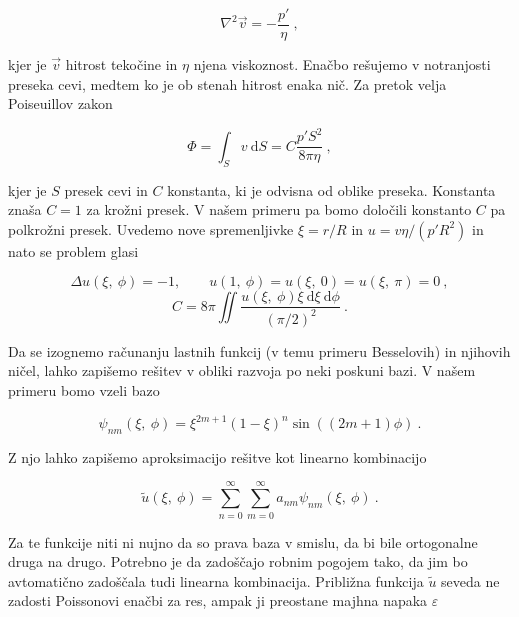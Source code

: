 \documentclass[a4paper]{article}
\newcommand{\ddd}{\mathrm{d}}
\begin{document}
\begin{equation}
    \nabla^2 \vec{v} = -\frac{p'}{\eta}\>,
    \label{eq:poisson}
\end{equation}

kjer je $\vec{v}$ hitrost tekočine in $\eta$ njena viskoznost. Enačbo rešujemo v notranjosti preseka cevi, medtem ko
je ob stenah hitrost enaka nič. Za pretok velja Poiseuillov zakon

\begin{equation}
    \Phi = \int_S{v\>\ddd S}  = C \frac{p' S^2}{8\pi\eta}\>,
    \label{eq:poiseuille}
\end{equation}

kjer je $S$ presek cevi in $C$ konstanta, ki je odvisna od oblike preseka. Konstanta znaša $C = 1$ za krožni presek.
V našem primeru pa bomo določili konstanto $C$ pa polkrožni presek. Uvedemo nove spremenljivke $\xi = r/R$ in 
$u=v\eta/(p'R^2)$ in nato se problem glasi

\begin{equation}
    \Delta u(\xi,\>\phi) = -1, \qquad u(1,\>\phi) = u(\xi,\>0) = u(\xi,\>\pi) = 0\>,
    \label{eq:poisson2}
\end{equation}
\begin{equation}
    C = 8\pi \iint{\frac{u(\xi,\>\phi)\xi\>\ddd\xi\> \ddd\phi}{(\pi/2)^2}}\>.
\end{equation}

Da se izognemo računanju lastnih funkcij (v temu primeru Besselovih) in njihovih ničel, lahko zapišemo
rešitev v obliki razvoja po neki poskuni bazi. V našem primeru bomo vzeli bazo

\begin{equation}
    \psi_{nm}(\xi,\>\phi) = \xi^{2m+1}(1-\xi)^n \sin((2m+1)\phi)\>.
\end{equation}

Z njo lahko zapišemo aproksimacijo rešitve kot linearno kombinacijo 

\begin{equation}
    \tilde{u}(\xi,\>\phi) = \sum_{n=0}^{\infty}\sum_{m=0}^{\infty}{a_{nm}\psi_{nm}(\xi,\>\phi)}\>.
\end{equation}

Za te funkcije niti ni nujno da so prava baza v smislu, da bi bile ortogonalne druga na drugo. Potrebno je
da zadoščajo robnim pogojem tako, da jim bo avtomatično zadoščala tudi linearna kombinacija. Približna funkcija 
$\tilde{u}$ seveda ne zadosti Poissonovi enačbi za res, ampak ji preostane majhna napaka $\varepsilon$
\end{document}
